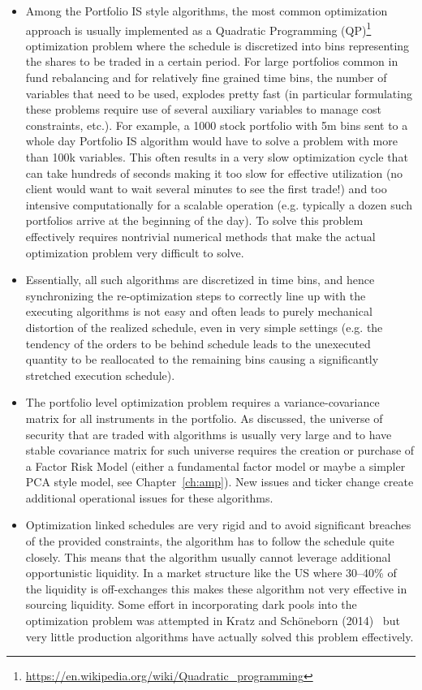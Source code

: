 \begin{itemize}
\item Among the Portfolio IS style algorithms, the most common optimization approach is usually implemented as a Quadratic Programming (QP)\footnote{\url{https://en.wikipedia.org/wiki/Quadratic_programming}} optimization problem where the schedule is discretized into bins representing the shares to be traded in a certain period.  For large portfolios common in fund rebalancing and for relatively fine grained time bins, the number of variables that need to be used, explodes pretty fast (in particular formulating these problems require use of several auxiliary variables to manage cost constraints, etc.). For example, a 1000 stock portfolio with 5m bins  sent to a whole day Portfolio IS algorithm would have to solve a problem with more than 100k variables. This often results in a very slow  optimization cycle that can take hundreds of seconds making it too slow for effective utilization (no client would want to wait several minutes to see the first trade!) and too intensive computationally for a scalable operation  (e.g. typically a dozen such portfolios arrive at the beginning of the day). To solve this problem effectively requires nontrivial numerical methods that make the actual optimization problem very difficult to solve.

\item Essentially, all such algorithms are discretized in time bins, and hence synchronizing the re-optimization steps to correctly line up with the executing algorithms is not easy and often leads to purely mechanical distortion of the realized schedule, even in very simple settings (e.g. the tendency of the orders to be behind schedule leads to the unexecuted quantity to be reallocated to the remaining bins causing a significantly stretched execution schedule).

\item The portfolio level optimization problem requires a variance-covariance matrix for all instruments in the portfolio. As discussed, the universe of security that are traded with algorithms is usually very large and to have stable covariance matrix for such universe requires the creation or purchase of a Factor Risk Model (either a fundamental factor model or maybe a simpler PCA style model, see Chapter~\ref{ch:amp}). New issues and ticker change create additional operational issues for these algorithms.

\item Optimization linked schedules are very rigid and to avoid significant breaches of the provided constraints, the algorithm has to follow the schedule quite closely. This means that the algorithm usually cannot leverage additional opportunistic liquidity. In a market structure like the US where 30--40\% of the liquidity is off-exchanges this makes these algorithm not very effective in sourcing liquidity. Some effort in incorporating dark pools into the optimization problem was attempted in Kratz and Sch\"oneborn (2014)~\cite{kratzschon} but very little production algorithms have actually solved this problem effectively. 
\end{itemize}



